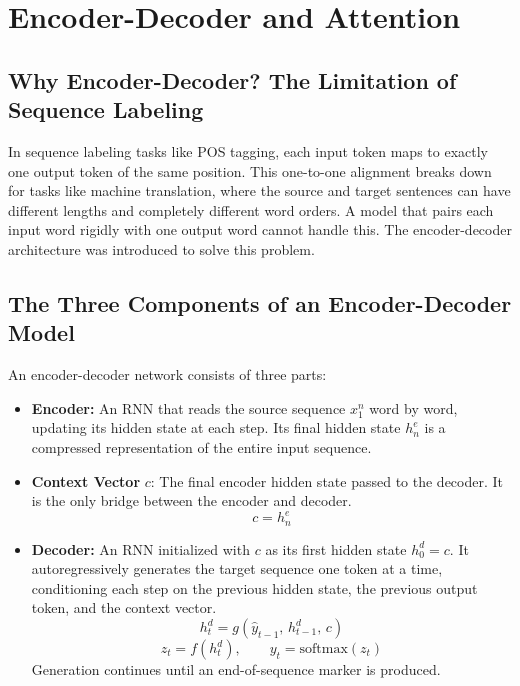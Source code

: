 \section{Encoder-Decoder and Attention}

\subsection{Why Encoder-Decoder? The Limitation of Sequence Labeling}

In sequence labeling tasks like POS tagging, each input token maps to exactly one output
token of the same position. This one-to-one alignment breaks down for tasks like machine
translation, where the source and target sentences can have different lengths and completely
different word orders. A model that pairs each input word rigidly with one output word
cannot handle this. The encoder-decoder architecture was introduced to solve this problem.

\subsection{The Three Components of an Encoder-Decoder Model}

An encoder-decoder network consists of three parts:

\begin{itemize}
    \item \textbf{Encoder:} An RNN that reads the source sequence $x_1^n$ word by word,
    updating its hidden state at each step. Its final hidden state $h_n^e$ is a compressed
    representation of the entire input sequence.

    \item \textbf{Context Vector} $c$: The final encoder hidden state passed to the decoder.
    It is the only bridge between the encoder and decoder.
    \[
        c = h_n^e
    \]

    \item \textbf{Decoder:} An RNN initialized with $c$ as its first hidden state
    $h_0^d = c$. It autoregressively generates the target sequence one token at a time,
    conditioning each step on the previous hidden state, the previous output token, and
    the context vector.
    \[
        h_t^d = g(\hat{y}_{t-1},\, h_{t-1}^d,\, c)
    \]
    \[
        z_t = f(h_t^d), \qquad y_t = \text{softmax}(z_t)
    \]
    Generation continues until an end-of-sequence marker is produced.
\end{itemize}

